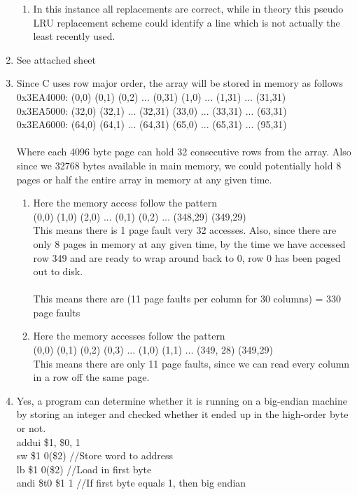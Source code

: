 \documentclass[11pt,fleqn]{article}
\begin{document}
\begin{enumerate}
\begin{enumerate}
\item In this instance all replacements are correct, while in theory this pseudo LRU replacement scheme could identify a line which is not actually the least recently used. 
\end{enumerate}
\item %
See attached sheet
\item %
Since C uses row major order, the array will be stored in memory as follows \\
0x3EA4000: (0,0) (0,1) (0,2) ... (0,31) (1,0) ... (1,31) ... (31,31) \\
0x3EA5000: (32,0) (32,1) ... (32,31) (33,0) ... (33,31) ... (63,31)\\
0x3EA6000: (64,0) (64,1) ... (64,31) (65,0) ... (65,31) ... (95,31)\\
\\
Where each 4096 byte page can hold 32 consecutive rows from the array. Also since we 32768 bytes available in main memory, we could potentially hold 8 pages or half the entire array in memory at any given time. 
\begin{enumerate}
\item %
Here the memory access follow the pattern \\
(0,0) (1,0) (2,0) ... (0,1) (0,2) ... (348,29) (349,29) \\
This means there is 1 page fault very 32 accesses. Also, since there are only 8 pages in memory at any given time, by the time we have accessed row 349 and are ready to wrap around back to 0, row 0 has been paged out to disk. \\
\\
This means there are (11 page faults per column for 30 columns) = 330 page faults
\item %
Here the memory accesses follow the pattern \\
(0,0) (0,1) (0,2) (0,3) ... (1,0) (1,1) ... (349, 28) (349,29) \\
This means there are only 11 page faults, since we can read every column in a row off the same page.
\end{enumerate} 
\item %
Yes, a program can determine whether it is running on a big-endian machine by storing an integer and checked whether it ended up in the high-order byte or not. \\
addui \$1, \$0, 1 \\
sw \$1 0(\$2) //Store word to address\\ 
lb \$1 0(\$2)  //Load in first byte \\
andi \$t0 \$1 1  //If first byte equals 1, then big endian \\


\end{enumerate}
\end{document}
